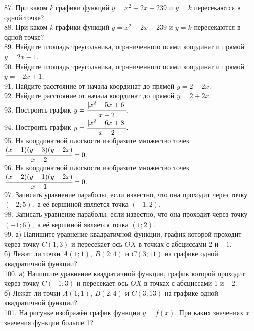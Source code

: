 \documentclass[12pt]{article}
\begin{document}
87. При каком $k$ графики функций $y=x^2-2x+239$ и $y=k$ пересекаются в одной точке?\\
88. При каком $k$ графики функций $y=x^2+2x-239$ и $y=k$ пересекаются в одной точке?\\
89. Найдите площадь треугольника, ограниченного осями координат и прямой $y=2x-1.$\\
90. Найдите площадь треугольника, ограниченного осями координат и прямой $y=-2x+1.$\\
91. Найдите расстояние от начала координат до прямой $y=2-2x.$\\
92. Найдите расстояние от начала координат до прямой $y=2+2x.$\\
93. Построить график $y=\cfrac{|x^2-5x+6|}{x-2}.$\\
94. Построить график $y=\cfrac{|x^2-6x+8|}{x-2}.$\\
95. На координатной плоскости изобразите множество точек $\cfrac{(x-1)(y-3)(y-2x)}{x-2}=0.$\\
96. На координатной плоскости изобразите множество точек $\cfrac{(x-2)(y-1)(y-2x)}{x-1}=0.$\\
97. Записать уравнение параболы, если известно, что она проходит через точку $(-2;5),$ а её вершиной является точка $(-1;2).$\\
98. Записать уравнение параболы, если известно, что она проходит через точку $(-1;6),$ а её вершиной является точка $(1;2).$\\
99. а) Напишите уравнение квадратичной функции, график которой проходит через точку $C(1;3)$ и пересекает ось $OX$ в точках с абсциссами 2 и $-1.$\\
б) Лежат ли точки $A(1;1),\ B(2;4)$ и $C(3;11)$ на графике одной квадратичной функции?\\
100. а) Напишите уравнение квадратичной функции, график которой проходит через точку $C(-1;3)$ и пересекает ось $OX$ в точках с абсциссами 1 и $-2.$\\
б) Лежат ли точки $A(1;1),\ B(2;4)$ и $C(3;13)$ на графике одной квадратичной функции?\\
101. На рисунке изображён график функции $y=f(x).$ При каких значениях $x$ значения функции больше 1?
\begin{figure}[ht!]
\end{figure}\\
\end{document}
